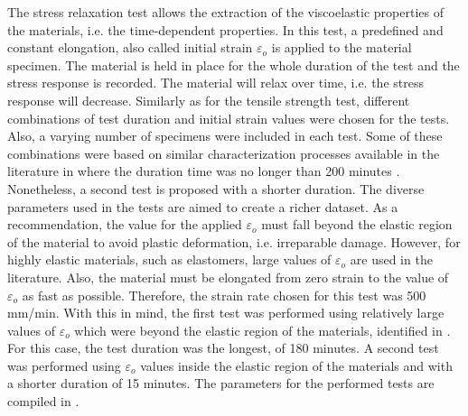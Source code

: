 The stress relaxation test allows the extraction of the viscoelastic properties of the materials, i.e. the time-dependent properties. In this test, a predefined and constant elongation, also called initial strain $\varepsilon_o$ is applied to the material specimen. The material is held in place for the whole duration of the test and the stress response is recorded. The material will relax over time, i.e. the stress response will decrease. Similarly as for the tensile strength test, different combinations of test duration and initial strain values were chosen for the tests. Also, a varying number of specimens were included in each test. Some of these combinations were based on similar characterization processes available in the literature in where the duration time was no longer than 200 minutes \cite{case2015soft,delin1995volume}. Nonetheless, a second test is proposed with a shorter duration. The diverse parameters used in the tests are aimed to create a richer dataset. As a recommendation, the value for the applied $\varepsilon_o$ must fall beyond the elastic region of the material to avoid plastic deformation, i.e. irreparable damage. However, for highly elastic materials, such as elastomers, large values of $\varepsilon_o$ are used in the literature. Also, the material must be elongated from zero strain to the value of $\varepsilon_o$ as fast as possible. Therefore, the strain rate chosen for this test was  500 mm/min. With this in mind, the first test was performed using relatively large values of $\varepsilon_o$ which were beyond the elastic region of the materials, identified in . For this case, the test duration was the longest, of 180 minutes. A second test was performed using $\varepsilon_o$ values inside the elastic region of the materials and with a shorter duration of 15 minutes. The parameters for the performed tests are compiled in .

